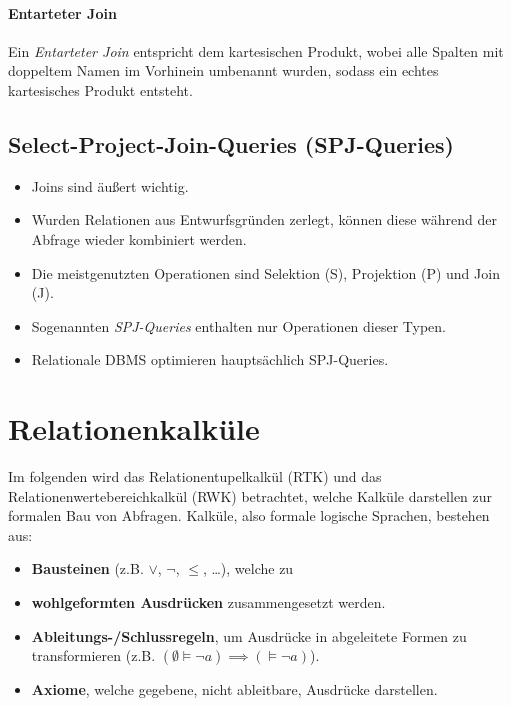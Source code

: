                 \paragraph{Entarteter Join} %
                    Ein \textit{Entarteter Join} entspricht dem kartesischen Produkt, wobei alle Spalten mit doppeltem Namen im Vorhinein umbenannt wurden, sodass ein echtes kartesisches Produkt entsteht.

        \subsection{Select-Project-Join-Queries (SPJ-Queries)} %
            \begin{itemize}
            	\item Joins sind äußert wichtig.
            	\item Wurden Relationen aus Entwurfsgründen zerlegt, können diese während der Abfrage wieder kombiniert werden.
            	\item Die meistgenutzten Operationen sind Selektion (S), Projektion (P) und Join (J).
            	\item Sogenannten \textit{SPJ-Queries} enthalten nur Operationen dieser Typen.
            	\item Relationale DBMS optimieren hauptsächlich SPJ-Queries.
            \end{itemize}

    \section{Relationenkalküle} %
        Im folgenden wird das Relationentupelkalkül (RTK) und das Relationenwertebereichkalkül (RWK) betrachtet, welche Kalküle darstellen zur formalen Bau von Abfragen. Kalküle, also formale logische Sprachen, bestehen aus:
        \begin{itemize}
        	\item \textbf{Bausteinen} (z.B. \(\lor\), \(\lnot\), \(\leq\), \dots), welche zu
        	\item \textbf{wohlgeformten Ausdrücken} zusammengesetzt werden.
        	\item \textbf{Ableitungs-/Schlussregeln}, um Ausdrücke in abgeleitete Formen zu transformieren (z.B. \( (\emptyset \models \lnot a) \implies (\models \lnot a) \)).
        	\item \textbf{Axiome}, welche gegebene, nicht ableitbare, Ausdrücke darstellen.
        \end{itemize}

